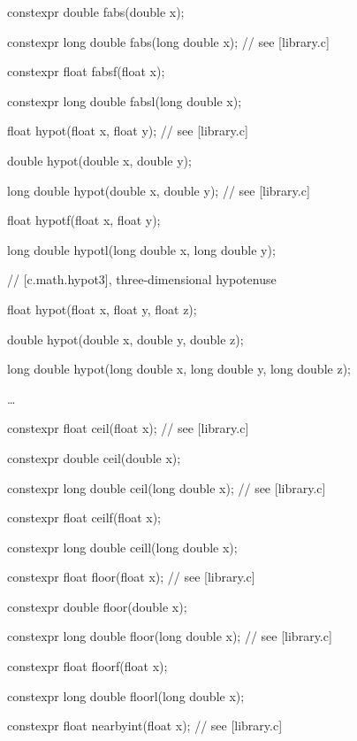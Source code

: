 \documentclass[prd,twocolumn,amsmath,amssymb,nofootinbib,eqsecnum]{revtex4-1}
\newcommand{\highlight}[1]{{\color{red} #1}}
\begin{document}
\begin{widetext}
{\highlight{constexpr} double fabs(double x);

\highlight{constexpr} long double fabs(long double x); // see [library.c]

\highlight{constexpr} float fabsf(float x);

\highlight{constexpr} long double fabsl(long double x);

\vspace{2ex}

float hypot(float x, float y); // see [library.c]

double hypot(double x, double y);

long double hypot(double x, double y); // see [library.c]

float hypotf(float x, float y);

long double hypotl(long double x, long double y);

\vspace{2ex}

// [c.math.hypot3], three-dimensional hypotenuse

float hypot(float x, float y, float z);

double hypot(double x, double y, double z);

long double hypot(long double x, long double y, long double z);

\ldots

\highlight{constexpr} float ceil(float x); // see [library.c]

\highlight{constexpr} double ceil(double x);

\highlight{constexpr} long double ceil(long double x); // see [library.c]

\highlight{constexpr} float ceilf(float x);

\highlight{constexpr} long double ceill(long double x);

\vspace{2ex}

\highlight{constexpr} float floor(float x); // see [library.c]

\highlight{constexpr} double floor(double x);

\highlight{constexpr} long double floor(long double x); // see [library.c]

\highlight{constexpr} float floorf(float x);

\highlight{constexpr} long double floorl(long double x);

\vspace{2ex}

\highlight{constexpr} float nearbyint(float x); // see [library.c]

}
\end{widetext}
\end{document}

